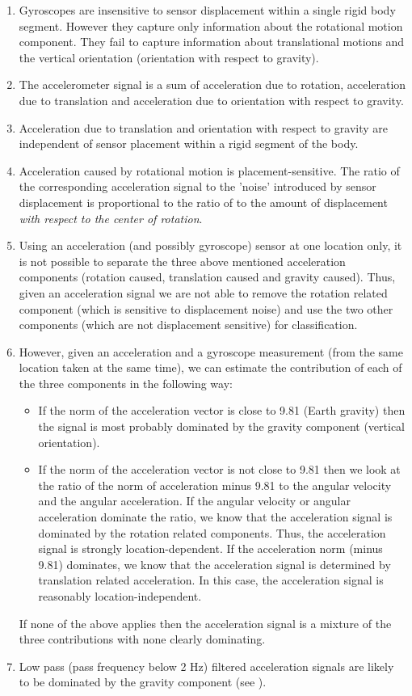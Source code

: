 \begin{enumerate}
\item Gyroscopes are insensitive to sensor displacement within a
  single rigid body segment. However they capture only information
  about the rotational motion component. They fail to capture
  information about translational motions and the vertical orientation
  (orientation with respect to gravity).
\item The accelerometer signal is a sum of acceleration due to rotation,
  acceleration due to translation and acceleration due to orientation
  with respect to gravity.  
\item Acceleration
  due to translation and  orientation with respect
  to gravity  are independent of sensor placement within a rigid
  segment of the body. 
\item  Acceleration caused by rotational motion is placement-sensitive. 
  The ratio of the corresponding acceleration signal to  the 'noise' introduced by sensor
  displacement   is proportional to the ratio  of  to the amount of  displacement
 {\em with respect to the center of rotation}. 
\item Using an acceleration (and  possibly gyroscope)  sensor at one location only, it is not
  possible to separate the three above mentioned acceleration components
  (rotation caused, translation caused and gravity caused).  Thus,
  given an acceleration signal we are not able to remove the rotation
  related component (which is sensitive to displacement noise) and
  use the two other components (which are not
  displacement sensitive) for classification.
\item However, given an acceleration and a gyroscope measurement
  (from the same location taken at the same time), we can estimate
  the  contribution of each of the three components in the following way:
\begin{itemize}
  \item If the norm of the acceleration vector is close to 9.81 (Earth
    gravity) then the signal is most probably
    dominated by the gravity component (vertical orientation).
  \item  If the norm of the acceleration vector is not close to 9.81
    then  we look at the ratio of the norm  of acceleration minus 9.81 
    to the angular velocity and the angular acceleration. 
    If the angular velocity or angular acceleration dominate the ratio, 
    we know that the acceleration signal is dominated by the rotation related 
    components. Thus, the acceleration signal is strongly location-dependent. 
    If the acceleration norm (minus 9.81) dominates, we know that the
    acceleration signal is determined by translation related
    acceleration. In this case, the acceleration signal is reasonably location-independent.
\end{itemize}
If none of the above applies then the acceleration signal is a
mixture of the three contributions with none clearly dominating.
\item Low pass (pass frequency below 2 Hz) filtered acceleration signals
  are likely to be dominated by the gravity component (see \cite{kern2003wsa}). 
\end{enumerate}

